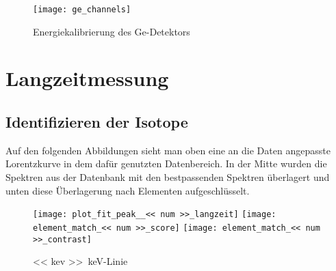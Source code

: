 \documentclass[11pt, ngerman, fleqn, DIV=15, headinclude, BCOR=2cm]{scrreprt}
\newcommand{\plotwidth}{0.8\linewidth}
\begin{document}
\begin{appendix}
\begin{figure}
    \centering
    \texttt{[image: ge\_channels]}
    \caption{%
	    Energiekalibrierung des Ge-Detektors
    }
    \label{fig:ge_kanal}
\end{figure}



\clearpage

\chapter{Langzeitmessung}

\section{Identifizieren der Isotope}\label{anhang-bodenprobe}
Auf den folgenden Abbildungen sieht man oben eine an die Daten angepasste
Lorentzkurve in dem dafür genutzten Datenbereich. In der Mitte wurden die
Spektren aus der Datenbank mit den bestpassenden Spektren überlagert und unten
diese Überlagerung nach Elementen aufgeschlüsselt.


\begin{figure}
    \centering
    \texttt{[image: plot\_fit\_peak\_\_<< num >>\_langzeit]}
    \texttt{[image: element\_match\_<< num >>\_score]}
    \texttt{[image: element\_match\_<< num >>\_contrast]}
    \caption{%
        \SI{<< kev >>}{\kilo\electronvolt}-Linie
    }
    \label{fig:}
\end{figure}

\end{appendix}
\end{document}
